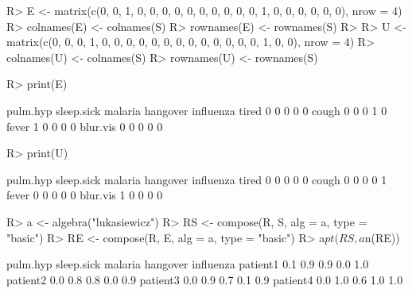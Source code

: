 \documentclass{article}\usepackage[]{graphicx}\usepackage[]{color}
\begin{document}
\begin{Schunk}
\begin{Sinput}
R> E <- matrix(c(0, 0, 1, 0, 0, 0, 0, 0, 0, 0, 0, 0, 0, 1, 0, 0, 0, 0, 0, 0), 
       nrow = 4)
R> colnames(E) <- colnames(S)
R> rownames(E) <- rownames(S)
R> 
R> U <- matrix(c(0, 0, 0, 1, 0, 0, 0, 0, 0, 0, 0, 0, 0, 0, 0, 0, 0, 1, 0, 0), 
       nrow = 4)
R> colnames(U) <- colnames(S)
R> rownames(U) <- rownames(S)
\end{Sinput}
\end{Schunk}

\begin{Schunk}
% --begin: "comp.e"
\begin{Sinput}
R> print(E)
\end{Sinput}
\begin{Soutput}
         pulm.hyp sleep.sick malaria hangover influenza
tired           0          0       0        0         0
cough           0          0       0        1         0
fever           1          0       0        0         0
blur.vis        0          0       0        0         0
\end{Soutput}
%
% --end: "comp.e"
\end{Schunk}

\begin{Schunk}
% --begin: "comp.u"
\begin{Sinput}
R> print(U)
\end{Sinput}
\begin{Soutput}
         pulm.hyp sleep.sick malaria hangover influenza
tired           0          0       0        0         0
cough           0          0       0        0         1
fever           0          0       0        0         0
blur.vis        1          0       0        0         0
\end{Soutput}
%
% --end: "comp.u"
\end{Schunk}

\begin{Schunk}
% --begin: "comp.circ.excl"
\begin{Sinput}
R> a <- algebra("lukasiewicz")
R> RS <- compose(R, S, alg = a, type = "basic")
R> RE <- compose(R, E, alg = a, type = "basic")
R> a$pt(RS, a$n(RE))
\end{Sinput}
\begin{Soutput}
         pulm.hyp sleep.sick malaria hangover influenza
patient1      0.1        0.9     0.9      0.0       1.0
patient2      0.0        0.8     0.8      0.0       0.9
patient3      0.0        0.9     0.7      0.1       0.9
patient4      0.0        1.0     0.6      1.0       1.0
\end{Soutput}
%
% --end: "comp.circ.excl"
\end{Schunk}
\end{document}
